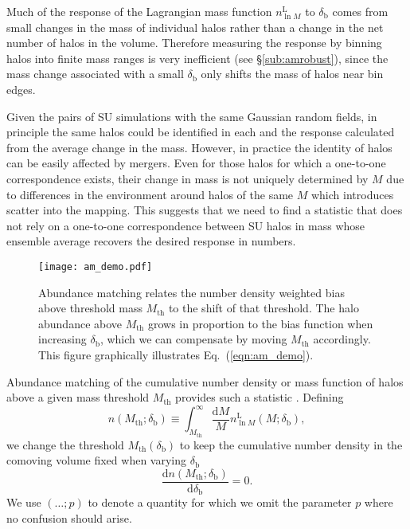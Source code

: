 \documentclass[prd,twocolumn,amsmath,amssymb,floatfix,superscriptaddress]{revtex4-1}
\newcommand{\br}{\textrm{b}}
\newcommand{\Lr}{\textrm{L}}
\newcommand{\dr}{\mathrm{d}}
\newcommand{\Mth}{{M_\textrm{th}}}
\newcommand{\lnM}{{\ln\!M}}
\begin{document}
Much of the response of the Lagrangian mass function  $n_\lnM^\Lr$ to $\delta_\br$ comes from small
changes in the mass of individual  halos rather than a change in the net number of halos
in the volume.   Therefore measuring the response by binning halos into finite
mass ranges is very inefficient (see \S \ref{sub:amrobust}), since the mass change associated with
a small $\delta_\br$ only shifts the mass of halos near bin edges.


Given the pairs of  SU simulations with the same Gaussian random fields, in principle
the same halos could be identified in each and the response calculated from the average change in the
mass.
However, in practice the identity of halos can be easily affected by mergers.
Even for those halos for which a one-to-one correspondence exists,
their change in mass is not uniquely determined by $M$ due to differences in the 
environment around halos of the same $M$ which introduces scatter into the mapping.
This suggests that we need to find a statistic that does not rely on a one-to-one 
correspondence between SU halos in mass whose ensemble average recovers the desired response in numbers.




\begin{figure}[tb]
    \centering
    \texttt{[image: am\_demo.pdf]}
    \caption{\footnotesize 
        Abundance matching relates the number density weighted bias
        above threshold mass $\Mth$ to the shift of that threshold.
        The halo abundance above $\Mth$ grows in proportion to the bias function
        when increasing $\delta_\br$, which we can compensate by moving $\Mth$ accordingly.
        This figure graphically illustrates Eq.~(\ref{eqn:am_demo}).
    }
    \label{fig:am_demo}
\end{figure}



Abundance matching of the cumulative number density or mass function of halos above a given mass threshold 
$\Mth$
provides such a statistic \cite{Kravtsovetal:04,Reddicketal:13}. 
Defining
\begin{equation}
    n(\Mth; \delta_\br) \equiv
    \int_\Mth^\infty\!\! \frac{\dr M}{M} n_\lnM^\Lr(M; \delta_\br),
    \label{eqn:cmf}
\end{equation}
we change the threshold $\Mth(\delta_\br)$
to keep the cumulative number density in the comoving volume
fixed when varying $\delta_\br$
%
\begin{equation}
    \frac{\dr n(\Mth; \delta_\br)}{\dr\delta_\br} = 0.
    \label{eqn:am}
\end{equation}
%
We use  $(\ldots; p)$ to denote a quantity for which we omit the parameter $p$
where no confusion should arise.
\end{document}
